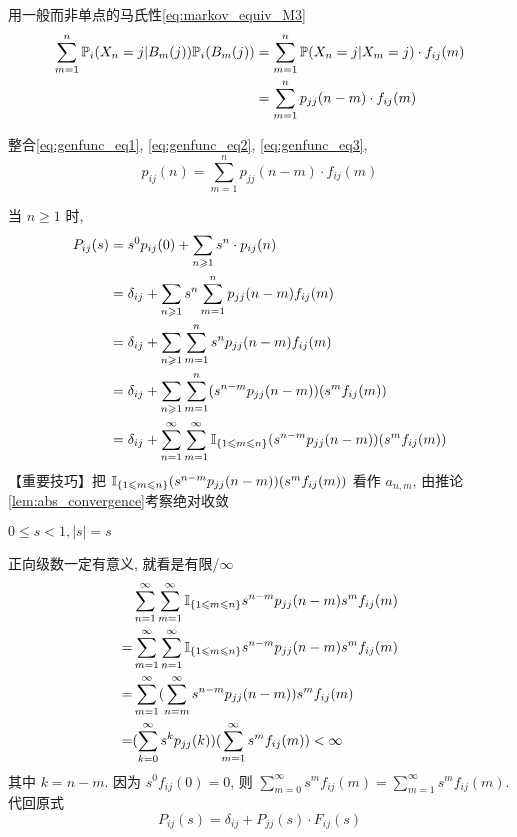 用一般而非单点的马氏性\eqref{eq:markov_equiv_M3}
\begin{equation}
\begin{aligned}
    \sum_{m=1}^n\mathbb{P}_i(X_n=j|B_m(j))\mathbb{P}_i(B_m(j))&=\sum_{m=1}^n\mathbb{P}(X_n=j|X_m=j)\cdot f_{ij}(m)\\
    &=\sum_{m=1}^n p_{jj}(n-m)\cdot f_{ij}(m)
\end{aligned}
\label{eq:genfunc_eq3}
\end{equation}

整合\eqref{eq:genfunc_eq1}, \eqref{eq:genfunc_eq2}, \eqref{eq:genfunc_eq3},
\begin{equation}
p_{ij}(n)=\sum_{m=1}^n p_{jj}(n-m)\cdot f_{ij}(m)
\label{eq:genfunc_eq4}
\end{equation}

当 $n\geq 1$ 时, 
\[
\begin{aligned}
    P_{ij}(s)&=s^0p_{ij}(0)+\sum_{n\geqslant 1}s^n\cdot p_{ij}(n)\\
    &=\delta_{ij}+\sum_{n\geqslant 1}s^n\sum_{m=1}^n p_{jj}(n-m)f_{ij}(m)\\
    &=\delta_{ij}+\sum_{n\geqslant 1}\sum_{m=1}^n s^n p_{jj}(n-m)f_{ij}(m)\\
    &=\delta_{ij}+\sum_{n\geqslant 1}\sum_{m=1}^n(s^{n-m}p_{jj}(n-m))(s^m f_{ij}(m))\\
    &=\delta_{ij}+\sum_{n=1}^{\infty}\sum_{m=1}^{\infty}\mathbb I_{\{1\leqslant m\leqslant n\}}(s^{n-m}p_{jj}(n-m))(s^m f_{ij}(m))
\end{aligned}
\]
【重要技巧】把 $\mathbb I_{\{1\leqslant m\leqslant n\}}(s^{n-m}p_{jj}(n-m))(s^m f_{ij}(m))$ 看作 $a_{n,m}$, 由推论\ref{lem:abs_convergence}考察绝对收敛

$0\leq s<1, |s|=s$

正向级数一定有意义, 就看是有限/$\infty$
\[
\begin{aligned}
    &\sum_{n=1}^{\infty}\sum_{m=1}^{\infty}\mathbb I_{\{1\leqslant m\leqslant n\}}s^{n-m}p_{jj}(n-m)s^m f_{ij}(m)\\
    =&\sum_{m=1}^{\infty}\sum_{n=1}^{\infty}\mathbb I_{\{1\leqslant m\leqslant n\}}s^{n-m}p_{jj}(n-m)s^m f_{ij}(m)\\
    =&\sum_{m=1}^{\infty}(\sum_{n=m}^{\infty}s^{n-m}p_{jj}(n-m))s^m f_{ij}(m)\\
    =&(\sum_{k=0}^{\infty}s^{k}p_{jj}(k))(\sum_{m=1}^{\infty}s^m f_{ij}(m))<\infty
\end{aligned}
\]
其中 $k=n-m$. 因为 $s^0f_{ij}(0)=0$, 则 $\sum_{m=0}^{\infty}s^m f_{ij}(m)=\sum_{m=1}^{\infty}s^m f_{ij}(m)$.代回原式
\[
P_{ij}(s)=\delta_{ij}+P_{jj}(s)\cdot F_{ij}(s)
\]

